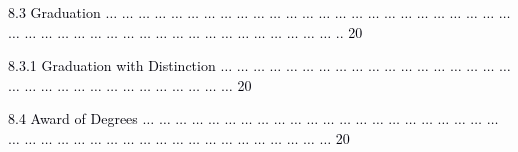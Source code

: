 \documentclass[12pt]{article}
\begin{document}
\vspace{\baselineskip}
\begin{adjustwidth}{0.21in}{0.0in}
{\fontsize{7pt}{8.4pt}\selectfont \textcolor[HTML]{00000A}{8.3 Graduation $ \ldots $ $ \ldots $ $ \ldots $ $ \ldots $ $ \ldots $ $ \ldots $ $ \ldots $ $ \ldots $ $ \ldots $ $ \ldots $ $ \ldots $ $ \ldots $ $ \ldots $ $ \ldots $ $ \ldots $ $ \ldots $ $ \ldots $ $ \ldots $ $ \ldots $ $ \ldots $ $ \ldots $ $ \ldots $ $ \ldots $ $ \ldots $ $ \ldots $ $ \ldots $ $ \ldots $ $ \ldots $ $ \ldots $ $ \ldots $ $ \ldots $ $ \ldots $ $ \ldots $ $ \ldots $ $ \ldots $ $ \ldots $ $ \ldots $ $ \ldots $ $ \ldots $ $ \ldots $ $ \ldots $ $ \ldots $ $ \ldots $ $ \ldots $ $ \ldots $ .. 20}\par}\par

\end{adjustwidth}


\vspace{\baselineskip}
\begin{adjustwidth}{0.5in}{0.0in}
{\fontsize{7pt}{8.4pt}\selectfont \textcolor[HTML]{00000A}{8.3.1 Graduation with Distinction $ \ldots $ $ \ldots $ $ \ldots $ $ \ldots $ $ \ldots $ $ \ldots $ $ \ldots $ $ \ldots $ $ \ldots $ $ \ldots $ $ \ldots $ $ \ldots $ $ \ldots $ $ \ldots $ $ \ldots $ $ \ldots $ $ \ldots $ $ \ldots $ $ \ldots $ $ \ldots $ $ \ldots $ $ \ldots $ $ \ldots $ $ \ldots $ $ \ldots $ $ \ldots $ $ \ldots $ $ \ldots $ $ \ldots $ $ \ldots $ $ \ldots $ $ \ldots $  20}\par}\par

\end{adjustwidth}


\vspace{\baselineskip}
\begin{adjustwidth}{0.21in}{0.0in}
{\fontsize{7pt}{8.4pt}\selectfont \textcolor[HTML]{00000A}{8.4 Award of Degrees $ \ldots $ $ \ldots $ $ \ldots $ $ \ldots $ $ \ldots $ $ \ldots $ $ \ldots $ $ \ldots $ $ \ldots $ $ \ldots $ $ \ldots $ $ \ldots $ $ \ldots $ $ \ldots $ $ \ldots $ $ \ldots $ $ \ldots $ $ \ldots $ $ \ldots $ $ \ldots $ $ \ldots $ $ \ldots $ $ \ldots $ $ \ldots $ $ \ldots $ $ \ldots $ $ \ldots $ $ \ldots $ $ \ldots $ $ \ldots $ $ \ldots $ $ \ldots $ $ \ldots $ $ \ldots $ $ \ldots $ $ \ldots $ $ \ldots $ $ \ldots $ $ \ldots $ $ \ldots $ $ \ldots $ $ \ldots $  20}\par}\par

\end{adjustwidth}
\end{document}
